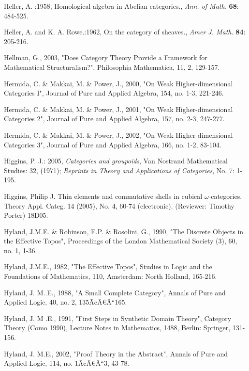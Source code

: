 \documentclass[12pt]{article}
\begin{document}
\begin{thebibliography}{199}
Heller, A. :1958, Homological algebra in Abelian categories., \emph{Ann. of Math.}
\textbf{68}: 484-525.

Heller, A.  and K. A. Rowe.:1962, On the category of sheaves., \emph{Amer J. Math.}
\textbf{84}: 205-216.

Hellman, G., 2003, "Does Category Theory Provide a Framework for Mathematical Structuralism?", Philosophia Mathematica, 11, 2, 129-157. 

Hermida, C. \& Makkai, M. \& Power, J., 2000, "On Weak Higher-dimensional Categories I", Journal of Pure and Applied Algebra, 154, no. 1-3, 221-246. 

Hermida, C. \& Makkai, M. \& Power, J., 2001, "On Weak Higher-dimensional Categories 2", Journal of Pure and Applied Algebra, 157, no. 2-3, 247-277.  

Hermida, C. \& Makkai, M. \& Power, J., 2002, "On Weak Higher-dimensional Categories 3", Journal of Pure and Applied Algebra, 166, no. 1-2, 83-104.  

Higgins, P. J.: 2005, \emph{Categories and groupoids}, Van
Nostrand Mathematical Studies: 32, (1971); \emph{Reprints in
Theory and Applications of Categories}, No. 7: 1-195.

Higgins, Philip J. Thin elements and commutative shells in cubical
$\omega$-categories. Theory Appl. Categ. 14 (2005), No. 4, 60-74
(electronic). (Reviewer: Timothy Porter) 18D05.

Hyland,  J.M.E. \& Robinson,  E.P. \& Rosolini, G., 1990, "The Discrete Objects in the Effective Topos", Proceedings of the London Mathematical Society (3), 60, no. 1, 1-36. 

Hyland,  J.M.E., 1982, "The Effective Topos", Studies in Logic and the Foundations of Mathematics, 110, Amsterdam: North Holland, 165-216.  

Hyland, J. M..E., 1988, "A Small Complete Category", Annals of Pure and Applied Logic, 40, no. 2, 135Ã¢Â€Â“165. 

Hyland,  J. M .E., 1991, "First Steps in Synthetic Domain Theory", Category Theory (Como 1990), Lecture Notes in Mathematics, 1488, Berlin: Springer, 131-156.  

Hyland, J. M.E., 2002, "Proof Theory in the Abstract", Annals of Pure and Applied Logic, 114, no. 1Ã¢Â€Â“3, 43-78. 


\end{thebibliography}
\end{document}
